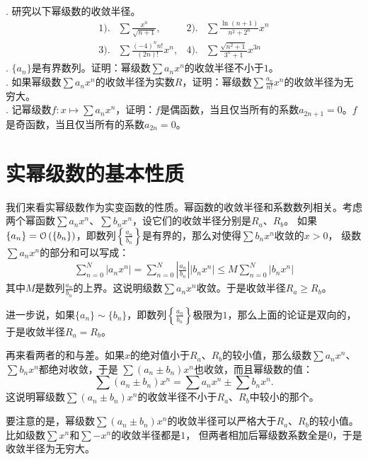 \documentclass[12pt,UTF8,fontset=none]{ctexbook}
\begin{document}
\begin{xt}    
    \mbox{} \\
    . 研究以下幂级数的收敛半径。\\
    \begin{align*}
        1).& \sum \frac{x^n}{\sqrt{n+1}} ,  &2).& \sum \frac{\ln{(n+1)}}{n^2 + 2^n} x^n \\
        3).& \sum \frac{(-4)^n n!}{(2n)!} x^n,  & 4).& \sum \frac{\sqrt{n^2+1}}{3^n+1} x^{3n} 
    \end{align*}
    . $\{a_n\}$是有界数列。证明：幂级数$\sum a_n x^n$的收敛半径不小于$1$。\\
    . 如果幂级数$\sum a_n x^n$的收敛半径为实数$R$，证明：幂级数$\sum \frac{a_n}{n!} x^n$的收敛半径为无穷大。\\
    . 记幂级数$f: x\mapsto \sum a_n x^n $，证明：$f$是偶函数，当且仅当所有的系数$a_{2n+1} = 0$。$f$是奇函数，当且仅当所有的系数$a_{2n} = 0$。
\end{xt}

\section{实幂级数的基本性质}

我们来看实幂级数作为实变函数的性质。幂函数的收敛半径和系数数列相关。考虑两个幂函数$\sum a_n x^n$、$\sum b_n x^n$，设它们的收敛半径分别是$R_a$、$R_b$。
如果$\{a_n\} = \mathcal{O}\left(\{b_n\}\right)$，即数列$\left\{\frac{a_n}{b_n}\right\}$是有界的，那么对使得$\sum b_n x^n$收敛的$x>0$，
级数$\sum a_n x^n$的部分和可以写成：
\begin{align*}
    \sum_{n=0}^{N} |a_n x^n| = \sum_{n=0}^{N} \left|\frac{a_n}{b_n}\right| |b_n x^n| \leqslant M \sum_{n=0}^{N} |b_n x^n|
\end{align*}
其中$M$是数列$\frac{a_n}{b_n}$的上界。这说明级数$\sum a_n x^n$收敛。于是收敛半径$R_a \geqslant R_b$。

进一步说，如果$\{a_n\} \sim \{b_n\}$，即数列$\left\{\frac{a_n}{b_n}\right\}$极限为$1$，那么上面的论证是双向的，于是收敛半径$R_a = R_b$。

再来看两者的和与差。如果$x$的绝对值小于$R_a$、$R_b$的较小值，那么级数$\sum a_n x^n$、$\sum b_n x^n$都绝对收敛，于是
$\sum (a_n \pm b_n) x^n$也收敛，而且幂级数的值：
$$\sum (a_n \pm b_n) x^n = \sum a_n x^n \pm \sum b_n x^n.$$
这说明幂级数$\sum (a_n \pm b_n) x^n$的收敛半径不小于$R_a$、$R_b$中较小的那个。

要注意的是，幂级数$\sum (a_n \pm b_n) x^n$的收敛半径可以严格大于$R_a$、$R_b$的较小值。比如级数$\sum x^n$和$\sum -x^n$的收敛半径都是$1$，
但两者相加后幂级数系数全是$0$，于是收敛半径为无穷大。
\end{document}
